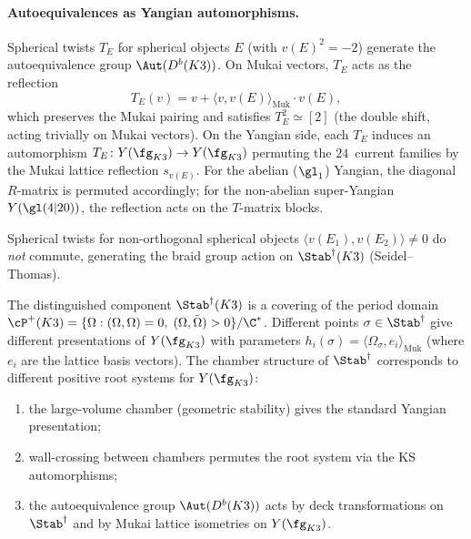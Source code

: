 \paragraph{Autoequivalences as Yangian automorphisms.}
Spherical twists $T_E$ for spherical objects $E$ (with $v(E)^2 = -2$) generate the autoequivalence group $\Aut(D^b(K3))$.  On Mukai vectors, $T_E$ acts as the reflection
\begin{equation}\label{eq:spherical-twist-reflection}
  T_E(v) = v + \langle v, v(E) \rangle_{\mathrm{Muk}} \cdot v(E),
\end{equation}
which preserves the Mukai pairing and satisfies $T_E^2 \simeq [2]$ (the double shift, acting trivially on Mukai vectors).  On the Yangian side, each $T_E$ induces an automorphism $T_E \colon Y(\fg_{K3}) \to Y(\fg_{K3})$ permuting the $24$~current families by the Mukai lattice reflection $s_{v(E)}$.  For the abelian ($\gl_1$) Yangian, the diagonal $R$-matrix is permuted accordingly; for the non-abelian super-Yangian $Y(\gl(4|20))$, the reflection acts on the $T$-matrix blocks.

Spherical twists for non-orthogonal spherical objects $\langle v(E_1), v(E_2) \rangle \neq 0$ do \emph{not} commute, generating the braid group action on $\Stab^\dagger(K3)$ (Seidel--Thomas).

\begin{conjecture}
\label{conj:stab-yangian-parameter}
\ClaimStatusConjectured
The distinguished component $\Stab^\dagger(K3)$ is a covering of the period domain $\cP^+(K3) = \{\Omega : (\Omega, \Omega) = 0, \; (\Omega, \bar\Omega) > 0\}/\C^*$.  Different points $\sigma \in \Stab^\dagger$ give different presentations of $Y(\fg_{K3})$ with parameters $h_i(\sigma) = \langle \Omega_\sigma, e_i \rangle_{\mathrm{Muk}}$ (where $e_i$ are the lattice basis vectors).  The chamber structure of $\Stab^\dagger$ corresponds to different positive root systems for $Y(\fg_{K3})$:
\begin{enumerate}[label=(\roman*)]
\item the large-volume chamber (geometric stability) gives the standard Yangian presentation;
\item wall-crossing between chambers permutes the root system via the KS automorphisms;
\item the autoequivalence group $\Aut(D^b(K3))$ acts by deck transformations on $\Stab^\dagger$ and by Mukai lattice isometries on $Y(\fg_{K3})$.
\end{enumerate}
\end{conjecture}

